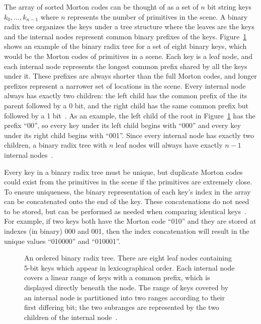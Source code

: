 \documentclass{sig-alternate}
\begin{document}
The array of sorted Morton codes can be thought of as a set of $n$ bit string keys \begin{math}k_{0},\dots,k_{n-1}\end{math} where $n$ represents the number of primitives in the scene. A binary radix tree organizes the keys under a tree structure where the leaves are the keys and the internal nodes represent common binary prefixes of the keys. Figure~\ref{fig:BinaryRadixTree} shows an example of the binary radix tree for a set of eight binary keys, which would be the Morton codes of primitives in a scene. Each key is a leaf node, and each internal node represents the longest common prefix shared by all the keys under it. These prefixes are always shorter than the full Morton codes, and longer prefixes represent a narrower set of locations in the scene. Every internal node always has exactly two children: the left child has the common prefix of the its parent followed by a 0 bit, and the right child has the same common prefix but followed by a 1 bit~\cite{Karras:2012}. As an example, the left child of the root in Figure~\ref{fig:BinaryRadixTree} has the prefix ``00'', so every key under its left child begins with ``000'' and every key under its right child begins with ``001''. Since every internal node has exactly two children, a binary radix tree with $n$ leaf nodes will always have exactly $n-1$ internal nodes~\cite{Wald:2007}.

Every key in a binary radix tree must be unique, but duplicate Morton codes could exist from the primitives in the scene if the primitives are extremely close. To ensure uniqueness, the binary representation of each key's index in the array can be concatenated onto the end of the key. These concatenations do not need to be stored, but can be performed as needed when comparing identical keys~\cite{Karras:2012}. For example, if two keys both have the Morton code ``010'' and they are stored at indexes (in binary) 000 and 001, then the index concatenation will result in the unique values ``010000'' and ``010001''. 

\begin{figure}
\centering
{}
\caption{An ordered binary radix tree. There are eight leaf nodes containing 5-bit keys which appear in lexicographical order. Each internal node covers a linear range of keys with a common prefix, which is displayed directly beneath the node. The range of keys covered by an internal node is partitioned into two ranges according to their first differing bit; the two subranges are represented by the two children of the internal node~\cite{Karras:2012}.}
\label{fig:BinaryRadixTree}
\end{figure}
\end{document}
